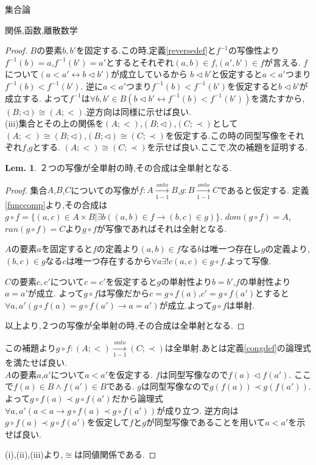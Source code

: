 \documentclass[14pt]{jsarticle}
\theoremstyle{definition}
\newtheorem{lem}[dfn]{Lem.}
\begin{document}
\begin{section}{集合論}
\begin{subsection}{関係,函数,離散数学}
\begin{proof}
$B$の要素$b,b'$を固定する.この時,定義\ref{reversedef}と$f^{-1}$の写像性より$f^{-1}(b)=a$,$f^{-1}(b')=a'$とするとそれぞれ$(a,b)\in f$,$(a',b')\in f$が言える.
$f$について$(a<a' \leftrightarrow b\triangleleft b')$が成立しているから
$b\triangleleft b'$と仮定すると$a<a'$つまり$f^{-1}(b)<f^{-1}(b')$.
逆に$a<a'$つまり$f^{-1}(b)<f^{-1}(b')$を仮定すると$b\triangleleft b'$が成立する.
よって$f^{-1}$は$\forall b,b'\in B(b\triangleleft b' \leftrightarrow f^{-1}(b)<f^{-1}(b'))$を満たすから,$(B;\triangleleft)\cong (A;<)$.逆方向は同様に示せば良い.\\
(iii)集合とその上の関係を$(A;<)$,$(B;\triangleleft)$,$(C;\prec)$として$(A;<)\cong(B;\triangleleft)$,$(B;\triangleleft)\cong(C;\prec)$を仮定する.この時の同型写像をそれぞれ$f$,$g$とする.
$(A;<)\cong(C;\prec)$を示せば良い.ここで,次の補題を証明する.
\begin{lem}
\label{homocomp}
２つの写像が全単射の時,その合成は全単射となる.
\end{lem}
\begin{proof}
集合$A$,$B$,$C$についての写像が$f:A\xrightarrow[1-1]{onto}B$,$g:B\xrightarrow[1-1]{onto}C$であると仮定する.
定義\ref{funccomp}より,その合成は$g\circ f=\{(a,c)\in A \times B|\exists b((a,b)\in f\to(b,c)\in g)\}$.
$dom(g\circ f)=A$,$ran(g\circ f)=C$より$g\circ f$が写像であればそれは全射となる.\par
$A$の要素$a$を固定すると$f$の定義より$(a,b)\in f$なる$b$は唯一つ存在し$g$の定義より,$(b,c)\in g$なる$c$は唯一つ存在するから$\forall a \exists ! c(a,c)\in g\circ f$.よって写像.\par
$C$の要素$c,c'$について$c=c'$を仮定すると$g$の単射性より$b=b'$,$f$の単射性より$a=a'$が成立.
よって$g\circ f$は写像だから$c=g\circ f(a)$,$c'=g\circ f(a')$とすると$\forall a,a'(g\circ f(a)=g\circ f(a') \to a=a')$が成立.よって$g\circ f$は単射.\par
以上より,２つの写像が全単射の時,その合成は全単射となる.
\end{proof}
この補題より$g\circ f:(A;<)\xrightarrow[1-1]{onto}(C;\prec)$は全単射.あとは定義\ref{congdef}の論理式を満たせば良い.\\
$A$の要素$a$,$a'$について$a<a'$を仮定する.
$f$は同型写像なので$f(a)\triangleleft f(a')$.
ここで$f(a)\in B\land f(a')\in B$である.
$g$は同型写像なので$g(f(a))\prec g(f(a'))$.
よって$g\circ f(a)\prec g\circ f(a')$だから論理式$\forall a,a'(a<a \to g\circ f(a)\prec g\circ f(a'))$が成り立つ.
逆方向は$g\circ f(a)\prec g\circ f(a')$を仮定して$f$と$g$が同型写像であることを用いて$a<a'$を示せば良い.\par
(i),(ii),(iii)より,$\cong$は同値関係である.

\end{proof}
\end{subsection}
\end{section}
\end{document}
